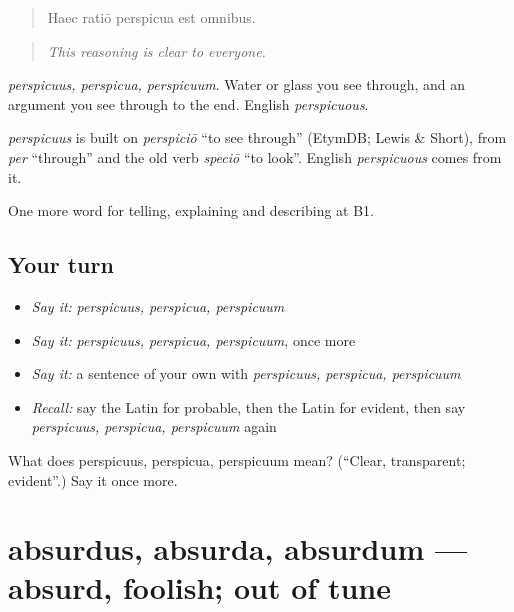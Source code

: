 \begin{quote}
Haec ratiō perspicua est omnibus.
\end{quote}

\begin{quote}
\emph{This reasoning is clear to everyone.}
\end{quote}

\emph{perspicuus, perspicua, perspicuum}. Water or glass you see through, and an argument you see through to the end. English \emph{perspicuous}.

\begin{cousinweb}
\emph{perspicuus} is built on \emph{perspiciō} \textquotedblleft{}to see through\textquotedblright{} (EtymDB; Lewis \& Short), from \emph{per} \textquotedblleft{}through\textquotedblright{} and the old verb \emph{speciō} \textquotedblleft{}to look\textquotedblright{}. English \emph{perspicuous} comes from it.
\end{cousinweb}

\begin{grammarlens}[title={What you've built}]
One more word for telling, explaining and describing at B1.
\end{grammarlens}

\subsection*{Your turn}
\begin{itemize}
\raggedright
  \item \emph{Say it:} \emph{perspicuus, perspicua, perspicuum}
  \item \emph{Say it:} \emph{perspicuus, perspicua, perspicuum}, once more
  \item \emph{Say it:} a sentence of your own with \emph{perspicuus, perspicua, perspicuum}
  \item \emph{Recall:} say the Latin for probable, then the Latin for evident, then say \emph{perspicuus, perspicua, perspicuum} again
\end{itemize}

\begin{tcolorbox}[breakable,colback=teal!4,colframe=teal!35!black,title={Before you move on}]
What does perspicuus, perspicua, perspicuum mean? (\textquotedblleft{}Clear, transparent; evident\textquotedblright{}.) Say it once more.
\end{tcolorbox}
\section[absurdus, absurda, absurdum]{absurdus, absurda, absurdum — absurd, foolish; out of tune}

